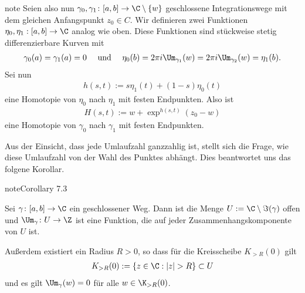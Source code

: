 \documentclass[letterpaper,10pt,german]{jupyterBook}
\begin{document}
\begin{sphinxadmonition}{note}
\sphinxAtStartPar
Seien also nun \(\gamma_0, \gamma_1 \colon [a,b] \rightarrow \C \setminus \{w\}\) geschlossene Integrationswege mit dem gleichen Anfangspunkt \(z_0 \in C\).
Wir definieren zwei Funktionen \(\eta_0, \eta_1 : [a,b] \rightarrow \C\) analog wie oben.
Diese Funktionen sind stückweise stetig differenzierbare Kurven mit
\begin{equation*}
\begin{split}\gamma_0(a) = \gamma_1(a) = 0 \quad \text{ und } \quad \eta_0(b) = 2 \pi i \Um_{\gamma_1}(w) = 2 \pi i \Um_{\gamma_2}(w) = \eta_1(b).\end{split}
\end{equation*}
\sphinxAtStartPar
Sei nun
\begin{equation*}
\begin{split}h(s,t) := s \eta_1(t) + (1-s) \eta_0(t)\end{split}
\end{equation*}
\sphinxAtStartPar
eine Homotopie von \(\eta_0\) nach \(\eta_1\) mit festen Endpunkten.
Also ist
\begin{equation*}
\begin{split}H(s,t) := w + \exp^{h(s,t)}(z_0 - w)\end{split}
\end{equation*}
\sphinxAtStartPar
eine Homotopie von \(\gamma_0\) nach \(\gamma_1\) mit festen Endpunkten.
\end{sphinxadmonition}

\sphinxAtStartPar
Aus der Einsicht, dass jede Umlaufzahl ganzzahlig ist, stellt sich die Frage, wie diese Umlaufzahl von der Wahl des Punktes abhängt.
Dies beantwortet uns das folgene Korollar.
\label{complexanalysis/residuensatz:corollary-11}
\begin{sphinxadmonition}{note}{Corollary 7.3}



\sphinxAtStartPar
Sei \(\gamma \colon [a,b] \rightarrow \C\) ein geschlossener Weg.
Dann ist die Menge \(U := \C \setminus \Im(\gamma)\) offen und \(\Um_\gamma \colon U \rightarrow \Z\) ist eine Funktion, die  auf jeder Zusammenhangskomponente von \(U\) ist.

\sphinxAtStartPar
Außerdem existiert ein Radius \(R > 0\), so dass für die Kreisscheibe \(K_{>R}(0)\) gilt
\begin{equation*}
\begin{split}K_{>R}(0) := \lbrace z \in \C : |z| > R \rbrace \subset U\end{split}
\end{equation*}
\sphinxAtStartPar
und es gilt \(\Um_\gamma(w) = 0\) für alle \(w \in \K_{>R}(0)\).
\end{sphinxadmonition}
\end{document}
